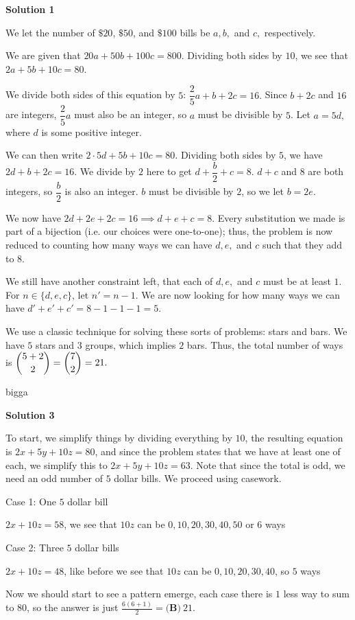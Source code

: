 \begin{enumerate}
\textbf{Solution 1}

We let the number of $\$20$, $\$50$, and $\$100$ bills be $a,b,$ and $c,$ respectively. 

 We are given that $20a+50b+100c=800.$ Dividing both sides by $10$, we see that $2a+5b+10c=80.$ 

 We divide both sides of this equation by $5$: $\dfrac25a+b+2c=16.$ Since $b+2c$ and $16$ are integers, $\dfrac25a$ must also be an integer, so $a$ must be divisible by $5$. Let $a=5d,$ where $d$ is some positive integer. 

 We can then write $2\cdot5d+5b+10c=80.$ Dividing both sides by $5$, we have $2d+b+2c=16.$ We divide by $2$ here to get $d+\dfrac b2+c=8.$ $d+c$ and $8$ are both integers, so $\dfrac b2$ is also an integer. $b$ must be divisible by $2$, so we let $b=2e$. 

 We now have $2d+2e+2c=16\implies d+e+c=8$. Every substitution we made is part of a bijection (i.e. our choices were one-to-one); thus, the problem is now reduced to counting how many ways we can have $d,e,$ and $c$ such that they add to $8$. 

 We still have another constraint left, that each of $d,e,$ and $c$ must be at least $1$. For $n\in\{d,e,c\}$, let $n'=n-1.$ We are now looking for how many ways we can have $d'+e'+c'=8-1-1-1=5.$ 

 We use a classic technique for solving these sorts of problems: stars and bars. We have $5$ stars and $3$ groups, which implies $2$ bars. Thus, the total number of ways is $\dbinom{5+2}2=\dbinom72=21.$ 

 bigga

 



\textbf{Solution 3}

To start, we simplify things by dividing everything by $10$, the resulting equation is $2x+5y+10z=80$, and since the problem states that we have at least one of each, we simplify this to $2x+5y+10z=63$. Note that since the total is odd, we need an odd number of $5$ dollar bills. We proceed using casework. 

 Case 1: One $5$ dollar bill

 $2x+10z=58$, we see that $10z$ can be $0,10,20,30,40,50$  or $6$ ways

 Case 2: Three $5$ dollar bills

 $2x+10z=48$, like before we see that $10z$ can be $0,10,20,30,40$, so $5$ ways

 Now we should start to see a pattern emerge, each case there is $1$ less way to sum to $80$, so the answer is just $\frac{6(6+1)}{2}=\boxed{\textbf{(B)}~21}$.


\end{enumerate}

